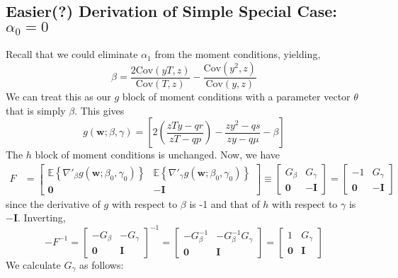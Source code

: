 \documentclass[12pt]{article}
\begin{document}
\subsection{Easier(?) Derivation of Simple Special Case: $\alpha_0 = 0$}
Recall that we could eliminate $\alpha_1$ from the moment conditions, yielding,
\[
  \beta = \frac{2 \mbox{Cov}(yT,z)}{\mbox{Cov}(T,z)} - \frac{\mbox{Cov}(y^2,z)}{\mbox{Cov}(y,z)}
\]
We can treat this as our $g$ block of moment conditions with a parameter vector $\theta$ that is simply $\beta$.
This gives
\[
  g(\mathbf{w}; \beta, \gamma) = \left[ 2\left(\frac{zTy - qr}{zT - qp}\right) - \frac{zy^2 - qs}{zy - q\mu} - \beta \right]
\]
The $h$ block of moment conditions is unchanged.
Now, we have
\begin{align*}
  F &= \left[
    \begin{array}{cc}
      \mathbb{E}\left\{\nabla'_\beta g(\mathbf{w};\beta_0, \gamma_0)\right\} & 
      \mathbb{E}\left\{\nabla'_\gamma g(\mathbf{w};\beta_0, \gamma_0)\right\}\\
\mathbf{0}& -\mathbf{I}
    \end{array}
  \right] \equiv
  \left[
  \begin{array}{cc}
    G_\beta & G_\gamma\\
    \mathbf{0} & - \mathbf{I}
  \end{array}
\right] = \left[
\begin{array}{cc}
  -1 & G_\gamma \\
    \mathbf{0} & - \mathbf{I}
\end{array}
\right]
\end{align*}
since the derivative of $g$ with respect to $\beta$ is -1 and that of $h$ with respect to $\gamma$ is $-\mathbf{I}$.
Inverting, 
\[
  -F^{-1} = 
  \left[
  \begin{array}{cc}
    -G_\beta & -G_\gamma \\
    \mathbf{0} & \mathbf{I}
  \end{array}
\right]^{-1} =
\left[
\begin{array}{cc}
  -G_{\beta}^{-1} & -G_{\beta}^{-1}G_{\gamma}\\
  \mathbf{0} & \mathbf{I}
\end{array}
\right] = \left[
\begin{array}{cc}
  1 & G_\gamma \\
  \mathbf{0} & \mathbf{I}
\end{array}
\right]
\]
We calculate $G_\gamma$ as follows: 
\end{document}
